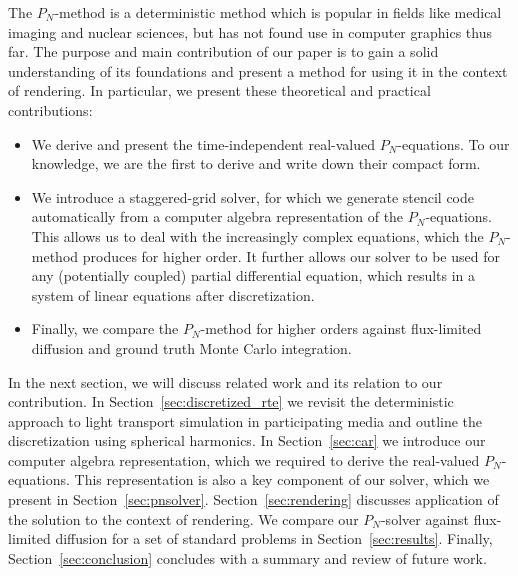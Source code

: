 The $P_N$-method is a deterministic method which is popular in fields like medical imaging and nuclear sciences, but has not found use in computer graphics thus far. The purpose and main contribution of our paper is to gain a solid understanding of its foundations and present a method for using it in the context of rendering. In particular, we present these theoretical and practical contributions:
\begin{itemize}
	\item We derive and present the time-independent real-valued $P_N$-equations. To our knowledge, we are the first to derive and write down their compact form.
	\item We introduce a staggered-grid solver, for which we generate stencil code automatically from a computer algebra representation of the $P_N$-equations. This allows us to deal with the increasingly complex equations, which the $P_N$-method produces for higher order. It further allows our solver to be used for any (potentially coupled) partial differential equation, which results in a system of linear equations after discretization.
	\item Finally, we compare the $P_N$-method for higher orders against flux-limited diffusion and ground truth Monte Carlo integration.
\end{itemize}

In the next section, we will discuss related work and its relation to our contribution. In Section~\ref{sec:discretized_rte} we revisit the deterministic approach to light transport simulation in participating media and outline the discretization using spherical harmonics. In Section~\ref{sec:car} we introduce our computer algebra representation, which we required to derive the real-valued $P_N$-equations. This representation is also a key component of our solver, which we present in Section~\ref{sec:pnsolver}. Section~\ref{sec:rendering} discusses application of the solution to the context of rendering. We compare our $P_N$-solver against flux-limited diffusion for a set of standard problems in Section~\ref{sec:results}. Finally, Section~\ref{sec:conclusion} concludes with a summary and review of future work.